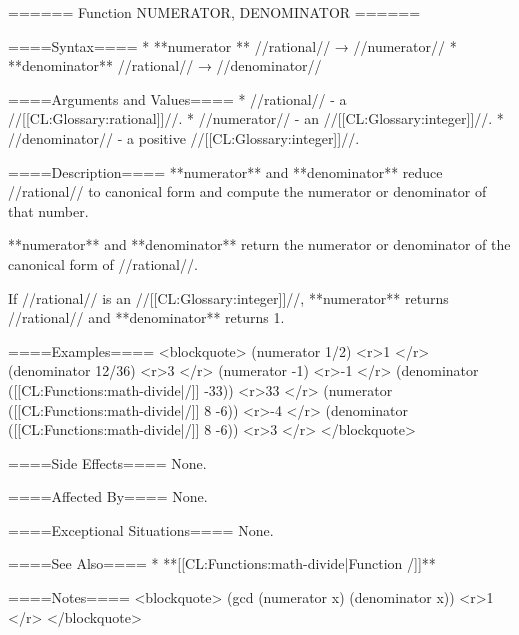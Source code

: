 ====== Function NUMERATOR, DENOMINATOR ======

====Syntax====
  * **numerator ** //rational// → //numerator// 
  * **denominator** //rational// → //denominator//

====Arguments and Values====
  * //rational// - a //[[CL:Glossary:rational]]//.
  * //numerator// - an //[[CL:Glossary:integer]]//.
  * //denominator// - a positive //[[CL:Glossary:integer]]//.

====Description====
**numerator** and **denominator** reduce //rational// to canonical form and compute the numerator or denominator of that number.

**numerator** and **denominator** return the numerator or denominator of the canonical form of //rational//.

If //rational// is an //[[CL:Glossary:integer]]//, **numerator** returns //rational// and **denominator** returns 1.

====Examples==== 
<blockquote> 
(numerator 1/2) <r>1 </r>
(denominator 12/36) <r>3 </r>
(numerator -1) <r>-1 </r>
(denominator ([[CL:Functions:math-divide|/]] -33)) <r>33 </r>
(numerator ([[CL:Functions:math-divide|/]] 8 -6)) <r>-4 </r>
(denominator ([[CL:Functions:math-divide|/]] 8 -6)) <r>3 </r>
</blockquote>

====Side Effects====
None.

====Affected By====
None.

====Exceptional Situations====
None.

====See Also====
  * **[[CL:Functions:math-divide|Function /]]**

====Notes==== 
<blockquote> 
(gcd (numerator x) (denominator x)) <r>1 </r>
</blockquote>

